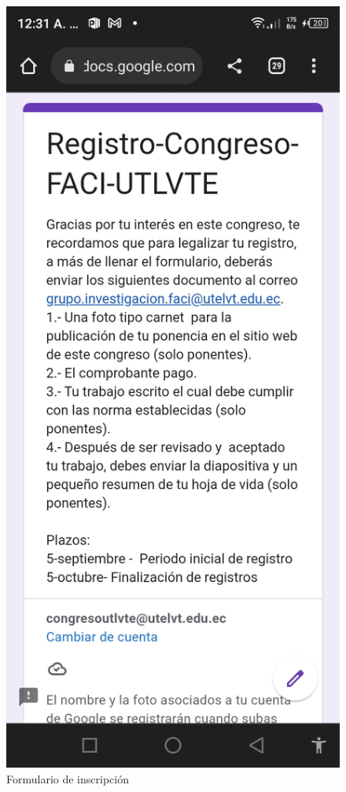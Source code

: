 \documentclass[a4paper,14px]{article}
\begin{document}
\begin{minipage}[H]{0.45\linewidth}
  \begin{figure}[H]
    \centering
    \includegraphics[scale=0.3]{inscripcion2.jpg}
    \caption{Formulario de inscripción}
    \label{fig:arquitectura2}
  \end{figure}
\end{minipage}
\end{document}
